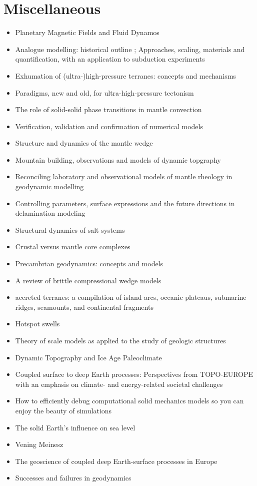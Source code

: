 \section{Miscellaneous}
\begin{itemize}
\item Planetary Magnetic Fields and Fluid Dynamos \cite{jone11}
\item Analogue modelling: historical outline \cite{koyi97}; Approaches, scaling, materials and quantification, with an application to subduction experiments \cite{scst16}
\item Exhumation of (ultra-)high-pressure terranes: concepts and mechanisms \cite{warr13}
\item Paradigms, new and old, for ultra-high-pressure tectonism \cite{hage13}
\item The role of solid-solid phase transitions in mantle convection \cite{fada17}
\item Verification, validation and confirmation of numerical models \cite{orsb94}
\item Structure and dynamics of the mantle wedge \cite{vank03}
\item Mountain building, observations and models of dynamic topgraphy \cite{flgm13,fabc13}
\item Reconciling laboratory and observational models of mantle rheology in geodynamic modelling \cite{king16}
\item Controlling parameters, surface expressions and the future directions in delamination modeling \cite{goue18}
\item Structural dynamics of salt systems \cite{javs94}
\item Crustal versus mantle core complexes \cite{brst18}
\item Precambrian geodynamics: concepts and models \cite{gery14}
\item A review of brittle compressional wedge models \cite{buit12}
\item accreted terranes: a compilation of island arcs, oceanic
      plateaus, submarine ridges, seamounts, and continental fragments \cite{tebu14}
\item Hotspot swells \cite{kiad14}
\item Theory of scale models as applied to the study of geologic structures \cite{hubb37}
\item Dynamic Topography and Ice Age Paleoclimate \cite{miac20}
\item Coupled surface to deep Earth processes: Perspectives from TOPO-EUROPE
with an emphasis on climate- and energy-related societal challenges \cite{clsk23}
\item How to efficiently debug computational solid mechanics models so
you can enjoy the beauty of simulations \cite{copb23}
\item The solid Earth's influence on sea level \cite{conr13}  
\item Vening Meinesz \cite{vlaa89}
\item The geoscience of coupled deep Earth-surface processes in Europe \cite{clzb07}
\item Successes and failures in geodynamics \cite{jaco01}
\end{itemize}





